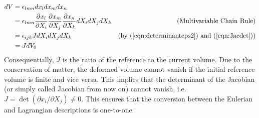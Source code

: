 \begin{align}
dV &= \epsilon_{lmn} dx_ldx_mdx_n \nonumber \\
&= \epsilon_{lmn} \frac{\partial x_l}{\partial X_i}\frac{\partial x_m}{\partial X_j}\frac{\partial x_n}{\partial X_k} dX_idX_jdX_k & \text{(Multivariable Chain Rule)} \nonumber \\
&= \epsilon_{ijk} J dX_idX_jdX_k & \text{(by (\ref{eqn:determinanteps2}) and (\ref{eqn:Jacdet}))} \nonumber \\
&= J dV_0 \label{eqn:dVJdV_0}
\end{align}
Consequentially, $J$ is the ratio of the reference to the current volume. Due to the conservation of matter, the deformed volume cannot vanish if the initial reference volume is finite and vice versa. This implies that the determinant of the Jacobian (or simply called Jacobian from now on) cannot vanish, i.e.\ $J = \det(\partial x_i/\partial X_j) \neq 0$. This ensures that the conversion between the Eulerian and Lagrangian descriptions is one-to-one.\par

